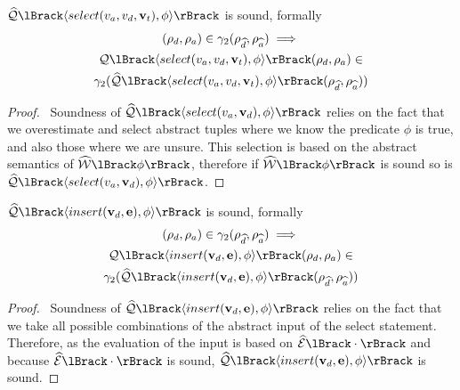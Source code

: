 \begin{conjecture}
    \label{thm:sound-select}
    $\abssqlsem{\langle select(v_a, v_d, \mathbf{v}_t), \phi \rangle}$ is sound, formally
    \begin{multline*}
    (\rho_d, \rho_a)
        \in \concrete_2(\rho_{\ab{d}}, \rho_{\ab{a}}) \implies \\
        \sqlsem{\langle select(v_a, v_d, \mathbf{v}_t), \phi \rangle}(\rho_d, \rho_a) \in \\
        \concrete_2(\abssqlsem{\langle select(v_a, v_d, \mathbf{v}_t), \phi \rangle}(\rho_{\ab{d}}, \rho_{\ab{a}}))
    \end{multline*}
\end{conjecture}


\begin{proof}
    \pfsketch\
    Soundness of $\abssqlsem{\langle select(v_a, \mathbf{v}_d), \phi \rangle}$ relies on the fact that we overestimate and select abstract tuples where we know the predicate $\phi$ is true, and also those where we are unsure.
    This selection is based on the abstract semantics of $\abspredsem{\phi}$, therefore if $\abspredsem{\phi}$ is sound so is $\abssqlsem{\langle select(v_a, \mathbf{v}_d), \phi \rangle}$.
\end{proof}


\begin{conjecture}
    \label{thm:sound-insert}
    $\abssqlsem{\langle insert(\mathbf{v}_d, \mathbf{e}), \phi \rangle}$ is sound, formally
    \begin{multline*}
    (\rho_d, \rho_a)
        \in \concrete_2(\rho_{\ab{d}}, \rho_{\ab{a}}) \implies \\
        \sqlsem{\langle insert(\mathbf{v}_d, \mathbf{e}), \phi \rangle}(\rho_d, \rho_a) \in \\
        \concrete_2(\abssqlsem{\langle insert(\mathbf{v}_d, \mathbf{e}), \phi \rangle}(\rho_{\ab{d}}, \rho_{\ab{a}}))
    \end{multline*}

\end{conjecture}


\begin{proof}
    \pfsketch\
    Soundness of $\abssqlsem{\langle insert(\mathbf{v}_d, \mathbf{e}), \phi \rangle}$ relies on the fact that we take all possible combinations of the abstract input of the select statement.
    Therefore, as the evaluation of the input is based on $\absexpsem{\cdot}$ and because $\absexpsem{\cdot}$ is sound, $\abssqlsem{\langle insert(\mathbf{v}_d, \mathbf{e}), \phi \rangle}$ is sound.
\end{proof}


